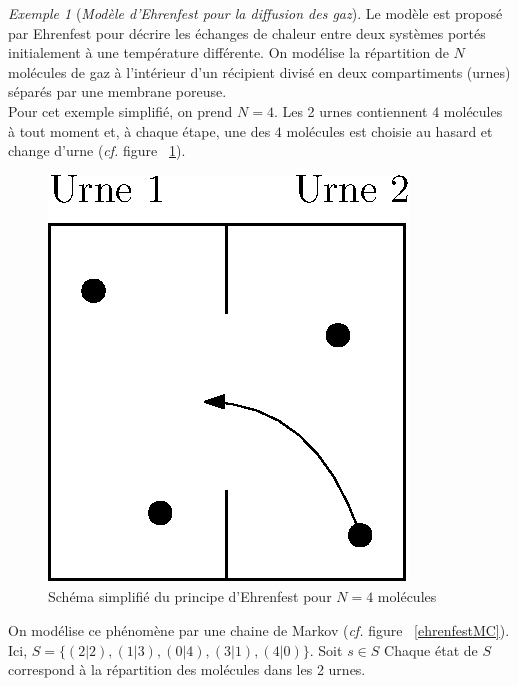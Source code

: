 \documentclass[12pt,a4paper]{report}
\theoremstyle{definition}%
\theoremstyle{remark}
\newtheorem{example}{Exemple}[chapter]
\newcommand{\cf}{\textit{cf.} }
\begin{document}
\begin{example}[\textit{Modèle d'Ehrenfest pour la diffusion des gaz}]
	Le modèle est proposé par Ehrenfest pour décrire les échanges de chaleur entre deux systèmes portés initialement à une température différente. On modélise la répartition de $N$ molécules de gaz à l'intérieur d'un récipient divisé en deux compartiments (urnes) séparés par une membrane poreuse.\\
	Pour cet exemple simplifié, on prend $N = 4$. Les 2 urnes contiennent $4$ molécules à tout moment et, à chaque étape, une des $4$ molécules est choisie au hasard et change d'urne (\cf figure ~\ref{ehrenfestscheme}).
	\begin{figure}[H]
		\centering
		\includegraphics[scale=0.5]{figures/EhrenfestUrne.eps}
		\caption{Schéma simplifié du principe d'Ehrenfest pour $N=4$ molécules}
		\label{ehrenfestscheme}
	\end{figure}
	On modélise ce phénomène par une chaine de Markov (\cf figure ~\ref{ehrenfestMC}). Ici, $S=\{(2|2), (1|3), (0|4), (3|1), (4|0) \}$. Soit $s \in S$ 
	Chaque état de $S$ correspond à la répartition des molécules dans les 2 urnes.
	\begin{figure}[H]
		\centering

\end{figure}
\end{example}
\end{document}

